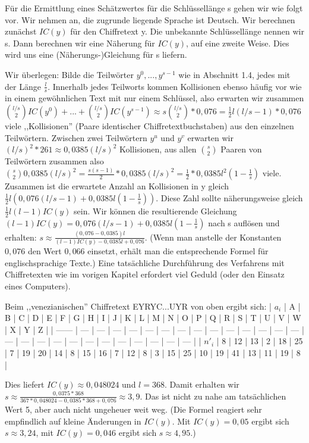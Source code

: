 \documentclass[a4paper]{article}
\begin{document}
\begin{multicols}{3}
    Für die Ermittlung eines Schätzwertes für die Schlüssellänge s gehen wir wie folgt vor. Wir nehmen an, die zugrunde liegende Sprache ist Deutsch. Wir berechnen zunächst $IC(y)$ für den Chiffretext y. Die unbekannte Schlüssellänge nennen wir s. Dann berechnen wir eine Näherung für $IC(y)$, auf eine zweite Weise. Dies wird uns eine (Näherungs-)Gleichung für s liefern.

    Wir überlegen: Bilde die Teilwörter $y^0,...,y^{s-1}$ wie in Abschnitt 1.4, jedes mit der Länge $\frac{l}{s}$. Innerhalb jedes Teilworts kommen Kollisionen ebenso häufig vor wie in einem gewöhnlichen Text mit nur einem Schlüssel, also erwarten wir zusammen $\binom{l/s}{2} IC(y^0)+...+\binom{l/s}{2} IC(y^{s-1})\approx s\binom{l/s}{2}* 0,076 = \frac{1}{2}l(l/s-1)* 0,076$ viele ,,Kollisionen''  (Paare identischer Chiffretextbuchstaben) aus den einzelnen Teilwörtern.
    Zwischen zwei Teilwörtern $y^u$ und $y^v$ erwarten wir $(l/s)^2*261\approx 0,0385(l/s)^2$ Kollisionen, aus allen $\binom{s}{2}$ Paaren von Teilwörtern zusammen also $\binom{s}{2} 0,0385(l/s)^2 =\frac{s(s-1)}{2}* 0,0385(l/s)^2 =\frac{1}{2} *0,0385 l^2 (1-\frac{1}{s})$ viele. Zusammen ist die erwartete Anzahl an Kollisionen in y gleich $\frac{1}{2}l(0,076(l/s-1) + 0,0385 l(1-\frac{1}{s}))$.
    Diese Zahl sollte näherungsweise gleich $\frac{1}{2}l(l-1)IC(y)$ sein. Wir können die resultierende Gleichung $(l-1)IC(y) = 0,076(l/s-1) + 0,0385 l(1-\frac{1}{s})$ nach s auflösen und erhalten: $s\approx \frac{(0,076-0,0385)l}{(l-1)IC(y)-0,0385l+0,076}$. (Wenn man anstelle der Konstanten $0,076$ den Wert $0,066$ einsetzt, erhält man die entsprechende Formel für englischsprachige Texte.)
    Eine tatsächliche Durchführung des Verfahrens mit Chiffretexten wie im vorigen Kapitel erfordert viel Geduld (oder den Einsatz eines Computers).

    Beim ,,venezianischen'' Chiffretext EYRYC...UYR von oben ergibt sich:
    | $a_i$  | A   | B   | C   | D   | E   | F   | G   | H   | I   | J   | K   | L   | M   | N   | O   | P   | Q   | R   | S   | T   | U   | V   | W   | X   | Y   | Z   |
    | ------ | --- | --- | --- | --- | --- | --- | --- | --- | --- | --- | --- | --- | --- | --- | --- | --- | --- | --- | --- | --- | --- | --- | --- | --- | --- | --- |
    | $n'_i$ | 8   | 12  | 13  | 2   | 18  | 25  | 7   | 19  | 20  | 14  | 8   | 15  | 16  | 7   | 12  | 8   | 3   | 15  | 25  | 10  | 19  | 41  | 13  | 11  | 19  | 8   |

    Dies liefert $IC(y)\approx 0,048024$ und $l=368$. Damit erhalten wir $s\approx\frac{0,0375*368}{367 *0,048024-0,0385 *368+0,076}\approx 3,9$.
    Das ist nicht zu nahe am tatsächlichen Wert 5, aber auch nicht ungeheuer weit weg. (Die Formel reagiert sehr empfindlich auf kleine Änderungen in $IC(y)$. Mit $IC(y)=0,05$ ergibt sich $s\approx 3,24$, mit $IC(y)=0,046$ ergibt sich $s\approx 4,95$.)


\end{multicols}
\end{document}
